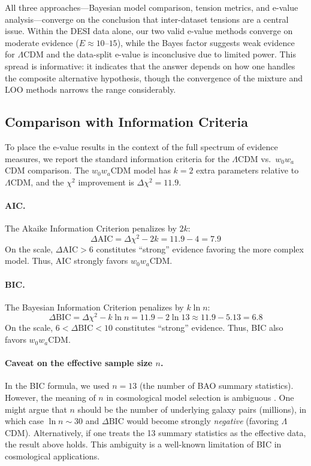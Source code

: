 \documentclass[11pt,a4paper]{article}
\newcommand{\LCDM}{$\Lambda$CDM}
\begin{document}
All three approaches---Bayesian model comparison, tension metrics, and e-value analysis---converge on the conclusion that inter-dataset tensions are a central issue. Within the DESI data alone, our two valid e-value methods converge on moderate evidence ($E \approx 10$--$15$), while the Bayes factor suggests weak evidence for \LCDM{} and the data-split e-value is inconclusive due to limited power. This spread is informative: it indicates that the answer depends on how one handles the composite alternative hypothesis, though the convergence of the mixture and LOO methods narrows the range considerably.

\subsection{Comparison with Information Criteria}
\label{sec:infocriteria}

To place the e-value results in the context of the full spectrum of evidence measures, we report the standard information criteria for the \LCDM{} vs.\ $w_0w_a$CDM comparison. The $w_0w_a$CDM model has $k = 2$ extra parameters relative to \LCDM, and the $\chi^2$ improvement is $\Delta\chi^2 = 11.9$.

\paragraph{AIC.} The Akaike Information Criterion \citep{BurnhamAnderson2002} penalizes by $2k$:
\begin{equation}
\Delta\text{AIC} = \Delta\chi^2 - 2k = 11.9 - 4 = 7.9
\end{equation}
On the \citet{BurnhamAnderson2002} scale, $\Delta\text{AIC} > 6$ constitutes ``strong'' evidence favoring the more complex model. Thus, AIC strongly favors $w_0w_a$CDM.

\paragraph{BIC.} The Bayesian Information Criterion \citep{Schwarz1978} penalizes by $k \ln n$:
\begin{equation}
\Delta\text{BIC} = \Delta\chi^2 - k \ln n = 11.9 - 2 \ln 13 \approx 11.9 - 5.13 = 6.8
\end{equation}
On the \citet{KassRaftery1995} scale, $6 < \Delta\text{BIC} < 10$ constitutes ``strong'' evidence. Thus, BIC also favors $w_0w_a$CDM.

\paragraph{Caveat on the effective sample size $n$.} In the BIC formula, we used $n = 13$ (the number of BAO summary statistics). However, the meaning of $n$ in cosmological model selection is ambiguous \citep{Liddle2007}. One might argue that $n$ should be the number of underlying galaxy pairs (millions), in which case $\ln n \sim 30$ and $\Delta\text{BIC}$ would become strongly \textit{negative} (favoring \LCDM). Alternatively, if one treats the 13 summary statistics as the effective data, the result above holds. This ambiguity is a well-known limitation of BIC in cosmological applications.
\end{document}
